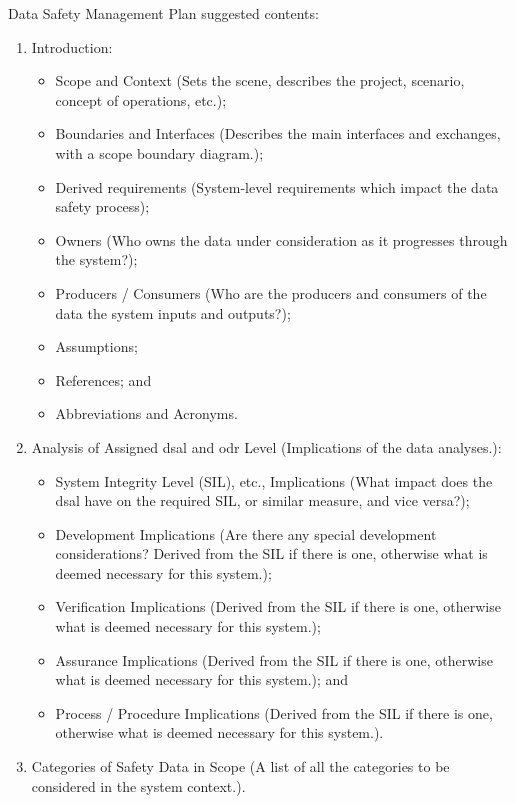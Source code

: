 Data Safety Management Plan suggested contents:
\begin{enumerate}
  \item Introduction:
  \begin{itemize}
    \item Scope and Context (Sets the scene, describes the project, scenario, concept of operations, etc.);
    \item Boundaries and Interfaces (Describes the main interfaces and exchanges, with a scope boundary diagram.);
    \item
      Derived requirements (System-level requirements which impact the data safety process);
    \item {}Owners (Who owns the data under consideration as it progresses through the system?);
    \item Producers / Consumers (Who are the producers and consumers of the data the system inputs and outputs?);
    \item Assumptions;
    \item References; and
    \item Abbreviations and Acronyms.
  \end{itemize}
  \item Analysis of Assigned \gls{dsal} and \gls{odr} Level (Implications of the data analyses.):
  \begin{itemize}
    \item System Integrity Level (SIL), etc., Implications (What impact does the \gls{dsal} have on the required SIL, or similar measure, and vice versa?);
    \item Development Implications (Are there any special development considerations? Derived from the SIL if there is one, otherwise what is deemed necessary for this system.);
    \item Verification Implications (Derived from the SIL if there is one, otherwise what is deemed necessary for this system.);
    \item Assurance Implications (Derived from the SIL if there is one, otherwise what is deemed necessary for this system.); and
    \item Process / Procedure Implications (Derived from the SIL if there is one, otherwise what is deemed necessary for this system.).
  \end{itemize}
\item
  Categories
  of Safety Data in Scope (A list of all the categories to be considered in the system context.).

\end{enumerate}
